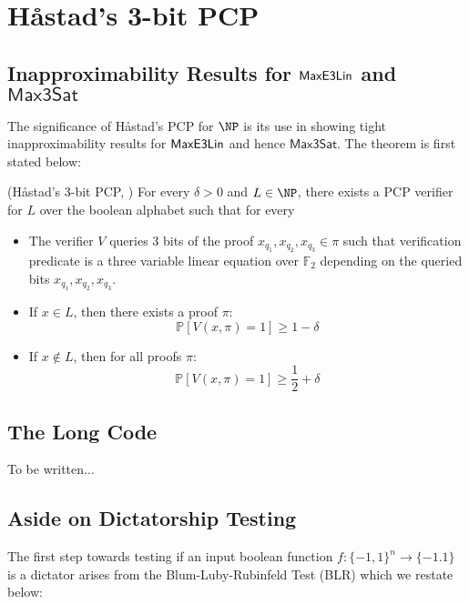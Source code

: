 \section{H\aa stad's 3-bit PCP}
\subsection{Inapproximability Results for $\mathsf{MaxE3Lin}$ and $\mathsf{Max3Sat}$}
The significance of H\aa stad's PCP for $\NP$ is its use in showing tight inapproximability results for $\mathsf{MaxE3Lin}$ and hence $\mathsf{Max3Sat}$. The theorem is first stated below:

\begin{theorem}(H\aa stad's 3-bit PCP, \cite{haastad2001some})
For every $\delta > 0$ and $L \in \NP$, there exists a PCP verifier for $L$ over the boolean alphabet such that for every
\begin{itemize}
  \item The verifier $V$ queries 3 bits of the proof $x_{q_1},x_{q_2}, x_{q_3} \in \pi$ such that verification predicate is a three variable linear equation over $\mathbb{F}_2$ depending on the queried bits $x_{q_1},x_{q_2}, x_{q_3}$.
  \item If $x \in L$, then there exists a proof $\pi$:
        \begin{equation}
          \mathbb{P}[V(x,\pi) = 1] \geq 1 - \delta
        \end{equation}
  \item If $x \not\in L$, then for all proofs $\pi$:
        \begin{equation}
          \mathbb{P}[V(x,\pi) = 1] \geq \frac{1}{2} + \delta
        \end{equation}
\end{itemize}

\end{theorem}

\subsection{The Long Code}
To be written...

\subsection{Aside on Dictatorship Testing}
The first step towards testing if an input boolean function $f:\{-1,1\}^n \rightarrow \{-1.1\}$ is a dictator arises from the Blum-Luby-Rubinfeld Test (BLR) which we restate below: \newline

